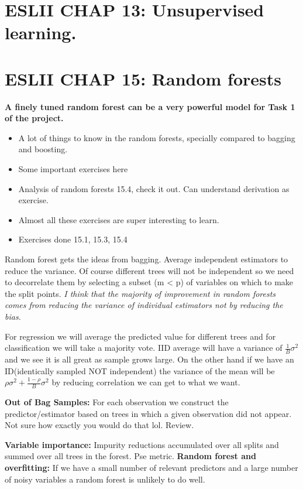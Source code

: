 \documentclass{article}
\begin{document}
\section*{ESLII CHAP 13: Unsupervised learning.}

\section*{ESLII CHAP 15: Random forests}
\textbf{A finely tuned random forest can be a very powerful model for Task 1 of the project.} 
\begin{itemize}
    \item A lot of things to know in the random forests, specially compared to bagging and boosting. 
    \item Some important exercises here
    \item Analysis of random forests 15.4, check it out. Can understand derivation as exercise.
    \item Almost all these exercises are super interesting to learn.
    \item Exercises done 15.1, 15.3, 15.4 
\end{itemize}
Random forest gets the ideas from bagging. Average independent estimators to reduce the variance. Of course different trees will not 
be independent so we need to decorrelate them by selecting a subset (m < p) of variables on which to make the split points. \textit{I think that the majority of improvement in random forests 
comes from reducing the variance of individual estimators not by reducing the bias.}

For regression we will average the predicted value for different trees and for classification we will take a majority vote.
IID average will have a variance of $\frac{1}{B}\sigma^2$ and we see it is all great as sample grows large. On the other hand if we have an ID(identically sampled NOT independent) 
the variance of the mean will be $\rho \sigma^2 + \frac{1 - \rho}{B}\sigma^2 $ by reducing correlation we can get to what we want. 

\textbf{Out of Bag Samples:}
For each observation we construct the predictor/estimator based on trees in which a given observation did not appear.
Not sure how exactly you would do that lol. Review. 

\textbf{Variable importance:}
Impurity reductions accumulated over all splits and summed over all trees in the forest. Pse metric.
\textbf{Random forest and overfitting:}
If we have a small number of relevant predictors and a large number of noisy variables a random forest is unlikely to do well.
\end{document}
